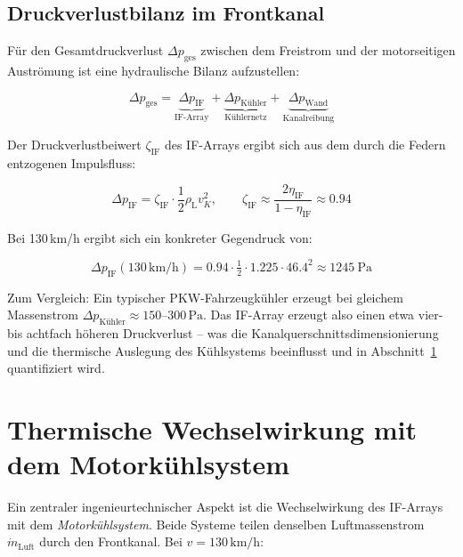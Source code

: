 ﻿\documentclass[12pt, a4paper]{report}
\theoremstyle{definition}
\theoremstyle{remark}
\newcommand{\rhoL}{\rho_{\text{L}}}
\begin{document}
\subsection{Druckverlustbilanz im Frontkanal}

Für den Gesamtdruckverlust $\Delta p_{\text{ges}}$ zwischen dem Freistrom und
der motorseitigen Auströmung ist eine hydraulische Bilanz aufzustellen:

\begin{equation}
  \Delta p_{\text{ges}} = \underbrace{\Delta p_{\text{IF}}}_{\text{IF-Array}}
  + \underbrace{\Delta p_{\text{Kühler}}}_{\text{Kühlernetz}}
  + \underbrace{\Delta p_{\text{Wand}}}_{\text{Kanalreibung}}
  \label{eq:druckverlust_bilanz}
\end{equation}

Der Druckverlustbeiwert $\zeta_{\text{IF}}$ des IF-Arrays ergibt sich aus dem
durch die Federn entzogenen Impulsfluss:

\begin{equation}
  \Delta p_{\text{IF}} = \zeta_{\text{IF}} \cdot \frac{1}{2}\rhoL v_K^2,
  \qquad \zeta_{\text{IF}} \approx \frac{2\eta_{\text{IF}}}{1 - \eta_{\text{IF}}}
  \approx 0.94
  \label{eq:zeta_if}
\end{equation}

Bei 130\,km/h ergibt sich ein konkreter Gegendruck von:

\begin{equation}
  \Delta p_{\text{IF}}(130\,\text{km/h})
  = 0.94 \cdot \tfrac{1}{2} \cdot 1.225 \cdot 46.4^2
  \approx \SI{1245}{\pascal}
  \label{eq:dp_if_130}
\end{equation}

Zum Vergleich: Ein typischer PKW-Fahrzeugkühler erzeugt bei gleichem Massenstrom
$\Delta p_{\text{Kühler}} \approx 150$--$300\,\text{Pa}$. Das IF-Array erzeugt
also einen etwa vier- bis achtfach höheren Druckverlust -- was die
Kanalquerschnittsdimensionierung und die thermische Auslegung des Kühlsystems
beeinflusst und in Abschnitt~\ref{sec:kfz_thermal} quantifiziert wird.

\section{Thermische Wechselwirkung mit dem Motorkühlsystem}
\label{sec:kfz_thermal}

Ein zentraler ingenieurtechnischer Aspekt ist die Wechselwirkung des
IF-Arrays mit dem \emph{Motorkühlsystem}. Beide Systeme teilen denselben
Luftmassenstrom $\dot{m}_{\text{Luft}}$ durch den Frontkanal. Bei
$v = 130\,\text{km/h}$:
\end{document}
